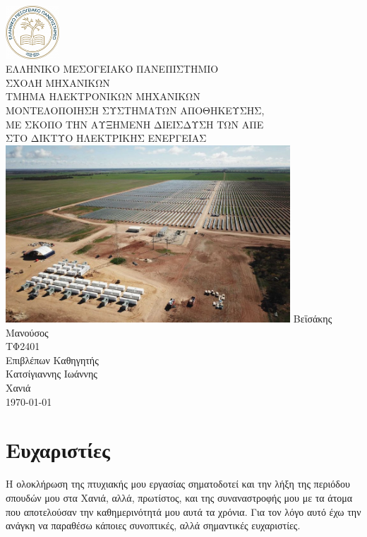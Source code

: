 \documentclass[12pt]{report}
\begin{document}
\begin{titlepage}
	\centering
	\includegraphics[width=0.15\textwidth]{hmu} \\ 
	\vspace{0.2cm}
	{\scshape ΕΛΛΗΝΙΚΟ ΜΕΣΟΓΕΙΑΚΟ ΠΑΝΕΠΙΣΤΗΜΙΟ \\ ΣΧΟΛΗ ΜΗΧΑΝΙΚΩΝ \\ ΤΜΗΜΑ ΗΛΕΚΤΡΟΝΙΚΩΝ ΜΗΧΑΝΙΚΩΝ \\}
	\vspace{1.5cm}
	{\scshape\Large ΜΟΝΤΕΛΟΠΟΙΗΣΗ ΣΥΣΤΗΜΑΤΩΝ ΑΠΟΘΗΚΕΥΣΗΣ, \\ΜΕ ΣΚΟΠΟ ΤΗΝ ΑΥΞΗΜΕΝΗ ΔΙΕΙΣΔΥΣΗ ΤΩΝ ΑΠΕ \\ΣΤΟ ΔΙΚΤΥΟ ΗΛΕΚΤΡΙΚΗΣ ΕΝΕΡΓΕΙΑΣ \\}
	\vspace{1cm}
	\includegraphics[width=0.8\textwidth]{gannawarra2}
	\vfill
	Βεϊσάκης Μανούσος \\
	ΤΦ2401 \\
	\vspace{0.5cm}
	Eπιβλέπων Καθηγητής\\
	Κατσίγιαννης Ιωάννης \\
	\vspace{2cm}
	{\large Χανιά \\ \today \\}
\end{titlepage}

\tableofcontents
\chapter*{Ευχαριστίες}
Η ολοκλήρωση της πτυχιακής μου εργασίας σηματοδοτεί και την λήξη της περιόδου σπουδών μου στα Χανιά, αλλά, πρωτίστος, και της συναναστροφής μου με τα άτομα που αποτελούσαν την καθημερινότητά μου αυτά τα χρόνια.
Για τον λόγο αυτό έχω την ανάγκη να παραθέσω κάποιες συνοπτικές, αλλά σημαντικές ευχαριστίες.
\end{document}
